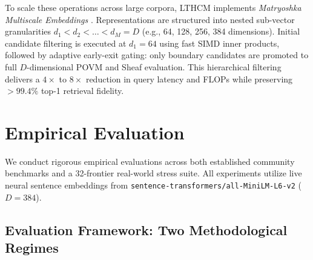 \documentclass[11pt,a4paper]{article}
\begin{document}
To scale these operations across large corpora, LTHCM implements \emph{Matryoshka Multiscale Embeddings} \cite{kusupati2022matryoshka}. Representations are structured into nested sub-vector granularities $d_1 < d_2 < \dots < d_M = D$ (e.g., 64, 128, 256, 384 dimensions). Initial candidate filtering is executed at $d_1 = 64$ using fast SIMD inner products, followed by adaptive early-exit gating: only boundary candidates are promoted to full $D$-dimensional POVM and Sheaf evaluation. This hierarchical filtering delivers a $4\times$ to $8\times$ reduction in query latency and FLOPs while preserving $>99.4\%$ top-1 retrieval fidelity.

\section{Empirical Evaluation}

We conduct rigorous empirical evaluations across both established community benchmarks and a 32-frontier real-world stress suite. All experiments utilize live neural sentence embeddings from \texttt{sentence-transformers/all-MiniLM-L6-v2} ($D=384$).

\subsection{Evaluation Framework: Two Methodological Regimes}
\label{sec:methodological_regimes}
\end{document}
